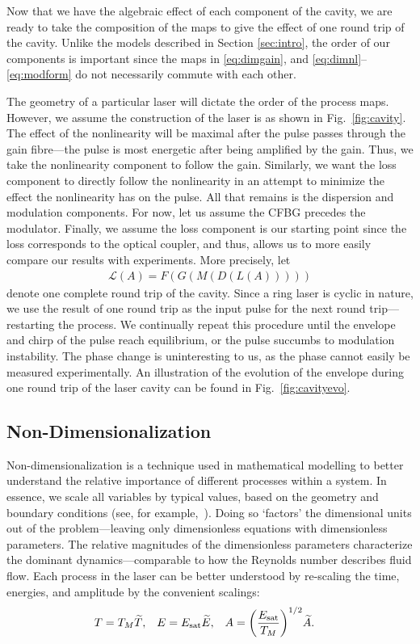 \documentclass[9pt,twocolumn,twoside]{osajnl}
\let\originalleft\left
\let\originalright\right
\renewcommand{\left}{\mathopen{}\mathclose\bgroup\originalleft}
\renewcommand{\right}{\aftergroup\egroup\originalright}
\newcommand{\Es}{E_{\textrm{sat}}} %
\begin{document}
Now that we have the algebraic effect of each component of the cavity, we are ready to take the composition of the maps to give the effect of one round trip of the cavity. Unlike the models described in Section \ref{sec:intro}, the order of our components is important since the maps in \eqref{eq:dimgain}, and \eqref{eq:dimnl}--\eqref{eq:modform} do not necessarily commute with each other.

The geometry of a particular laser will dictate the order of the process maps. However, we assume the construction of the laser is as shown in Fig.~\ref{fig:cavity}. The effect of the nonlinearity will be maximal after the pulse passes through the gain fibre---the pulse is most energetic after being amplified by the gain. Thus, we take the nonlinearity component to follow the gain. Similarly, we want the loss component to directly follow the nonlinearity in an attempt to minimize the effect the nonlinearity has on the pulse. All that remains is the dispersion and modulation components. For now, let us assume the CFBG precedes the modulator. Finally, we assume the loss component is our starting point since the loss corresponds to the optical coupler, and thus, allows us to more easily compare our results with experiments. More precisely, let
\begin{align}
	\mathcal{L}(A) = F(G(M(D(L(A)))))
	\label{eq:order}
\end{align}
denote one complete round trip of the cavity. Since a ring laser is cyclic in nature, we use the result of one round trip as the input pulse for the next round trip---restarting the process. We continually repeat this procedure until the envelope and chirp of the pulse reach equilibrium, or the pulse succumbs to modulation instability. The phase change is uninteresting to us, as the phase cannot easily be measured experimentally. An illustration of the evolution of the envelope during one round trip of the laser cavity can be found in Fig.~\ref{fig:cavityevo}.

\subsection{Non-Dimensionalization}
Non-dimensionalization is a technique used in mathematical modelling to better understand the relative importance of different processes within a system. In essence, we scale all variables by typical values, based on the geometry and boundary conditions (see, for example,~\cite{howison2005}). Doing so `factors' the dimensional units out of the problem---leaving only dimensionless equations with dimensionless parameters. The relative magnitudes of the dimensionless parameters characterize the dominant dynamics---comparable to how the Reynolds number describes fluid flow. Each process in the laser can be better understood by re-scaling the time, energies, and amplitude by the convenient scalings:
\begin{align}
	T &= T_M \widetilde{T},& E &= \Es \widetilde{E},& A &= \left( \frac{\Es}{T_M} \right)^{1/2} \widetilde{A}.
\end{align}
\end{document}
